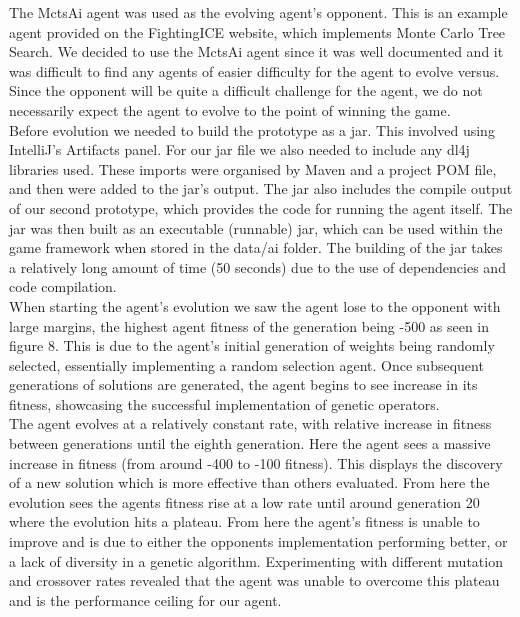 \documentclass[12pt,a4paper]{article}
\begin{document}
The MctsAi agent was used as the evolving agent's opponent. This is an example agent provided on the FightingICE website, which implements Monte Carlo Tree Search. We decided to use the MctsAi agent since it was well documented and it was difficult to find any agents of easier difficulty for the agent to evolve versus. Since the opponent will be quite a difficult challenge for the agent, we do not necessarily expect the agent to evolve to the point of winning the game.\\

Before evolution we needed to build the prototype as a jar. This involved using IntelliJ's Artifacts panel. For our jar file we also needed to include any dl4j libraries used. These imports were organised by Maven and a project POM file, and then were added to the jar's output. The jar also includes the compile output of our second prototype, which provides the code for running the agent itself. The jar was then built as an executable (runnable) jar, which can be used within the game framework when stored in the data/ai folder. The building of the jar takes a relatively long amount of time (50 seconds) due to the use of dependencies and code compilation.\\

\newpage
When starting the agent's evolution we saw the agent lose to the opponent with large margins, the highest agent fitness of the generation being -500 as seen in figure 8. This is due to the agent's initial generation of weights being randomly selected, essentially implementing a random selection agent. Once subsequent generations of solutions are generated, the agent begins to see increase in its fitness, showcasing the successful implementation of genetic operators.\\

The agent evolves at a relatively constant rate, with relative increase in fitness between generations until the eighth generation. Here the agent sees a massive increase in fitness (from around -400 to -100 fitness). This displays the discovery of a new solution which is more effective than others evaluated. From here the evolution sees the agents fitness rise at a low rate until around generation 20 where the evolution hits a plateau. From here the agent's fitness is unable to improve and is due to either the opponents implementation performing better, or a lack of diversity in a genetic algorithm. Experimenting with different mutation and crossover rates revealed that the agent was unable to overcome this plateau and is the performance ceiling for our agent.\\
\end{document}
